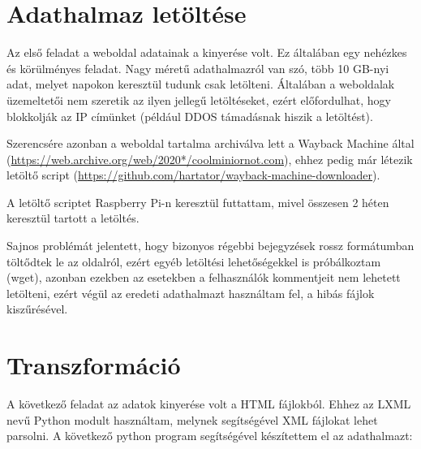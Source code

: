 \documentclass[14pt,a4paper]{article}
\begin{document}
\section{Adathalmaz letöltése}

Az első feladat a weboldal adatainak a kinyerése volt. Ez általában egy nehézkes és körülményes feladat. Nagy
méretű adathalmazról van szó, több 10 GB-nyi adat, melyet napokon keresztül tudunk csak letölteni. Általában a
weboldalak üzemeltetői nem szeretik az ilyen jellegű letöltéseket, ezért előfordulhat, hogy blokkolják az IP
címünket (például DDOS támadásnak hiszik a letöltést).

Szerencsére azonban a weboldal tartalma archiválva lett a Wayback Machine által (\url{https://web.archive.org/web/2020*/coolminiornot.com}), ehhez pedig már létezik letöltő script (\url{https://github.com/hartator/wayback-machine-downloader}).

A letöltő scriptet Raspberry Pi-n keresztül futtattam, mivel összesen 2 héten keresztül tartott a letöltés.

Sajnos problémát jelentett, hogy bizonyos régebbi bejegyzések rossz formátumban töltődtek le az oldalról, ezért egyéb
letöltési lehetőségekkel is próbálkoztam (wget), azonban ezekben az esetekben a felhasználók kommentjeit nem lehetett
letölteni, ezért végül az eredeti adathalmazt használtam fel, a hibás fájlok kiszűrésével.

\section{Transzformáció}

A következő feladat az adatok kinyerése volt a HTML fájlokból. Ehhez az LXML nevű Python modult használtam, melynek segítségével XML fájlokat lehet parsolni. A következő python program segítségével készítettem el az adathalmazt:

\inputminted[linenos, breaklines, fontsize=\footnotesize]{python}{../python/process.py}
\end{document}
